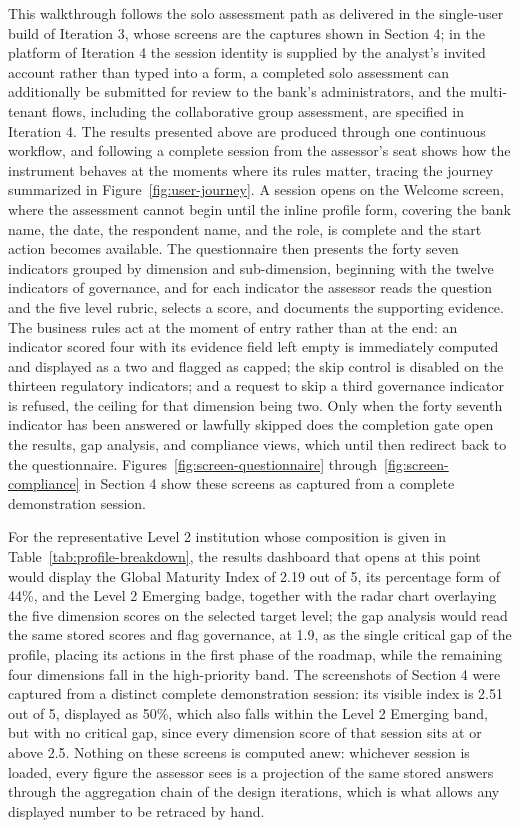 This walkthrough follows the solo assessment path as delivered in the single-user build of Iteration 3, whose screens are the captures shown in Section 4; in the platform of Iteration 4 the session identity is supplied by the analyst's invited account rather than typed into a form, a completed solo assessment can additionally be submitted for review to the bank's administrators, and the multi-tenant flows, including the collaborative group assessment, are specified in Iteration 4. The results presented above are produced through one continuous workflow, and following a complete session from the assessor's seat shows how the instrument behaves at the moments where its rules matter, tracing the journey summarized in Figure~\ref{fig:user-journey}. A session opens on the Welcome screen, where the assessment cannot begin until the inline profile form, covering the bank name, the date, the respondent name, and the role, is complete and the start action becomes available. The questionnaire then presents the forty seven indicators grouped by dimension and sub-dimension, beginning with the twelve indicators of governance, and for each indicator the assessor reads the question and the five level rubric, selects a score, and documents the supporting evidence. The business rules act at the moment of entry rather than at the end: an indicator scored four with its evidence field left empty is immediately computed and displayed as a two and flagged as capped; the skip control is disabled on the thirteen regulatory indicators; and a request to skip a third governance indicator is refused, the ceiling for that dimension being two. Only when the forty seventh indicator has been answered or lawfully skipped does the completion gate open the results, gap analysis, and compliance views, which until then redirect back to the questionnaire. Figures~\ref{fig:screen-questionnaire} through~\ref{fig:screen-compliance} in Section 4 show these screens as captured from a complete demonstration session.

For the representative Level 2 institution whose composition is given in Table~\ref{tab:profile-breakdown}, the results dashboard that opens at this point would display the Global Maturity Index of 2.19 out of 5, its percentage form of 44\%, and the Level 2 Emerging badge, together with the radar chart overlaying the five dimension scores on the selected target level; the gap analysis would read the same stored scores and flag governance, at 1.9, as the single critical gap of the profile, placing its actions in the first phase of the roadmap, while the remaining four dimensions fall in the high-priority band. The screenshots of Section 4 were captured from a distinct complete demonstration session: its visible index is 2.51 out of 5, displayed as 50\%, which also falls within the Level 2 Emerging band, but with no critical gap, since every dimension score of that session sits at or above 2.5. Nothing on these screens is computed anew: whichever session is loaded, every figure the assessor sees is a projection of the same stored answers through the aggregation chain of the design iterations, which is what allows any displayed number to be retraced by hand.

